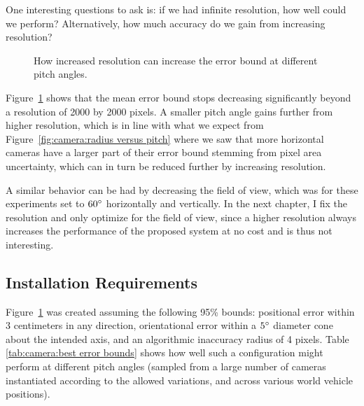 \documentclass[a4paper,12pt,twoside,openright]{report}
\begin{document}
One interesting questions to ask is: if we had infinite resolution,
how well could we perform? Alternatively, how much accuracy do we gain from increasing resolution?

\begin{figure}[htb]
    \begin{center}
        
    \end{center}
    \caption[Resolution Limits]{How increased resolution can increase the error bound at different pitch angles.}
    \label{fig:camera:resolution}
\end{figure}

Figure~\ref{fig:camera:resolution} shows that the mean error bound stops decreasing
significantly beyond a resolution of 2000 by 2000 pixels. A smaller pitch 
angle gains further from higher resolution, which is in line with what we 
expect from Figure~\ref{fig:camera:radius versus pitch} where we saw that more horizontal cameras
have a larger part of their error bound stemming from pixel area uncertainty,
which can in turn be reduced further by increasing resolution.

A similar behavior can be had by decreasing the field of view, which was for
these experiments set to $60\degree$ horizontally and vertically. 
In the next chapter, I fix the resolution and only optimize for the field of view,
since a higher resolution always increases the performance
of the proposed system at no cost and is thus not interesting.

\subsection{Installation Requirements}

Figure~\ref{fig:camera:resolution} was created assuming the following 95\% bounds: positional error
within 3 centimeters in any direction, orientational error within a
$5\degree$ diameter cone about the intended axis, 
and an algorithmic inaccuracy radius of 4 pixels. Table \ref{tab:camera:best error bounds}
shows how well such a configuration might perform at different pitch angles (sampled from
a large number of cameras instantiated according to the allowed variations,
and across various world vehicle positions). 

\end{document}
